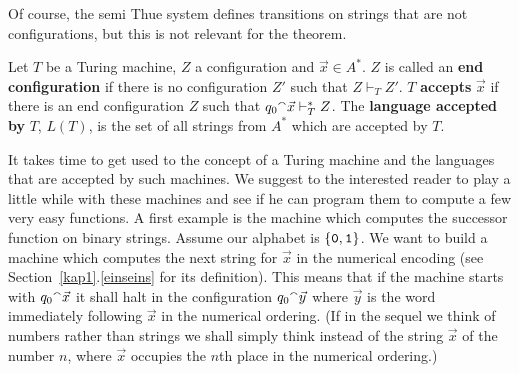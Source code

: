 Of course, the semi Thue system defines transitions on strings
that are not configurations, but this is not relevant for the
theorem.
\begin{defn}
Let $T$ be a Turing machine, $Z$ a configuration
and $\vec{x} \in A^{\ast}$. $Z$ is called an
\textbf{end configuration} if there is no configuration $Z'$
such that $Z \vdash_T Z'$. $T$ \textbf{accepts} $\vec{x}$
if there is an end configuration $Z$ such that
$q_0 {^{\smallfrown}} \vec{x} \vdash^{\ast}_T Z$. The \textbf{language
accepted by} $T$, $L(T)$, is the set of all strings from
$A^{\ast}$ which are accepted by $T$.
\end{defn}
It takes time to get used to the concept of a Turing
machine and the languages that are accepted by such
machines. We suggest to the interested reader to play
a little while with these machines and see if he can
program them to compute a few very easy functions.
A first example is the machine which computes the successor 
function on binary strings. Assume our alphabet is $\{\mbox{\tt 0}, %
\mbox{\tt 1}\}$.  We want to build a machine which computes the 
next string for $\vec{x}$ in the numerical encoding (see 
Section~\ref{kap1}.\ref{einseins} for its definition). This means that if 
the machine starts with $q_0 {^{\smallfrown}} \vec{x}$ it shall halt in the 
configuration $q_0 {^{\smallfrown}} \vec{y}$ where $\vec{y}$ is the word 
immediately following $\vec{x}$ in the numerical ordering. (If in the
sequel we think of numbers rather than strings we shall simply
think instead of the string $\vec{x}$ of the number $n$, where
$\vec{x}$ occupies the $n$th place in the numerical ordering.)

